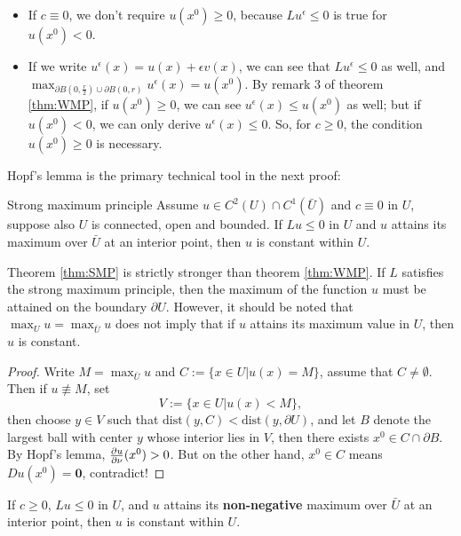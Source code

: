 \begin{remark}
    \begin{itemize}
    \item If $c\equiv 0$, we don't require $u(x^{0})\ge 0$, because $Lu^{\epsilon}\le 0$ is true for $u(x^{0})<0$.
    \item If we write $u^{\epsilon}(x)=u(x)+\epsilon v(x)$, we can see that $Lu^{\epsilon}\le 0$ as well, and $\max_{\partial B(0,\frac{r}{2})\cup \partial B(0,r)}u^{\epsilon}(x)=u(x^{0})$. By remark 3 of theorem \ref{thm:WMP}, if $u(x^{0})\ge 0$, we can see $u^{\epsilon}(x)\le u(x^{0})$ as well; but if $u(x^{0})<0$, we can only derive $u^{\epsilon}(x)\le 0$. So, for $c\ge 0$, the condition $u(x^{0})\ge 0$ is necessary.
    \end{itemize}
\end{remark}

Hopf's lemma is the primary technical tool in the next proof:
\begin{theorem}{Strong maximum principle}
    \label{thm:SMP}
    Assume $u\in C^{2}(U)\cap C^{1}(\bar{U})$ and $c\equiv 0$ in $U$, suppose also $U$ is connected, open and bounded. If $Lu\le 0$ in $U$ and $u$ attains its maximum over $\bar{U}$ at an interior point, then $u$ is constant within $U$.
\end{theorem}
\begin{remark}
Theorem \ref{thm:SMP} is strictly stronger than theorem \ref{thm:WMP}. If $L$ satisfies the strong maximum principle, then the maximum of the function $u$ must be attained on the boundary $\partial U$. However, it should be noted that $\max_{U}u=\max_{\bar{U}}u$ does not imply that if $u$ attains its maximum value in $U$, then $u$ is constant.
\end{remark}
\begin{proof}
    Write $M=\max_{\bar{U}}u$ and $C:=\{x\in U|u(x)=M\}$, assume that $C\neq\emptyset$. Then if $u\not\equiv M$, set 
    \begin{equation}
        V:=\{x\in U|u(x)<M\},
    \end{equation}
    then choose $y\in V$ such that $\text{dist}(y,C)<\text{dist}(y,\partial U)$, and let $B$ denote the largest ball with center $y$ whose interior lies in $V$, then there exists $x^{0}\in C\cap \partial B$. By Hopf's lemma, $\frac{\partial u}{\partial \nu}(x^{0})>0$. But on the other hand, $x^{0}\in C$ means $Du(x^{0})=\mathbf{0}$, contradict!
\end{proof}
\begin{remark}
    If $c\ge 0$, $Lu\le 0$ in $U$, and $u$ attains its \textbf{non-negative} maximum over $\bar{U}$ at an interior point, then $u$ is constant within $U$.
\end{remark}
